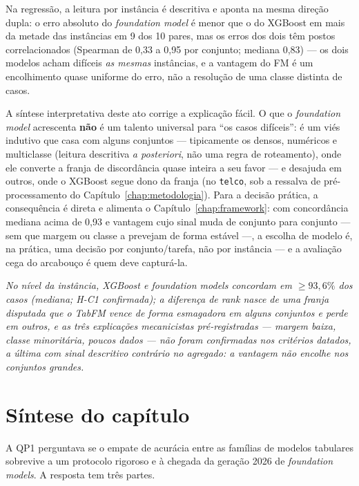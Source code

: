 Na regressão, a leitura por instância é descritiva e aponta na mesma
direção dupla: o erro absoluto do \emph{foundation model} é menor que o
do XGBoost em mais da metade das instâncias em 9 dos 10 pares, mas os
erros dos dois têm postos correlacionados (Spearman de 0{,}33 a 0{,}95
por conjunto; mediana 0{,}83) --- os dois modelos acham difíceis \emph{as mesmas}
instâncias, e a vantagem do FM é um encolhimento quase uniforme do
erro, não a resolução de uma classe distinta de casos.

A síntese interpretativa deste ato corrige a explicação fácil. O que o
\emph{foundation model} acrescenta \textbf{não} é um talento universal
para ``os casos difíceis'': é um viés indutivo que casa com alguns
conjuntos --- tipicamente os densos, numéricos e multiclasse (leitura
descritiva \emph{a posteriori}, não uma regra de roteamento), onde ele
converte a franja de discordância quase inteira a seu favor --- e
desajuda em outros, onde o XGBoost segue dono da franja (no
\texttt{telco}, sob a ressalva de pré-processamento do
Capítulo~\ref{chap:metodologia}). Para a decisão
prática, a consequência é direta e alimenta o
Capítulo~\ref{chap:framework}: com concordância mediana acima de 0{,}93
e vantagem cujo sinal muda de conjunto para conjunto --- sem que margem
ou classe a prevejam de forma estável ---, a escolha de modelo é, na
prática, uma decisão por conjunto/tarefa, não por
instância --- e a avaliação cega do arcabouço é quem deve capturá-la.

\emph{No nível da instância, XGBoost e \emph{foundation models}
concordam em ${\ge}93{,}6\%$ dos casos (mediana; H-C1 confirmada); a
diferença de rank nasce de uma franja disputada que o TabFM vence de
forma esmagadora em alguns conjuntos e perde em outros, e as três
explicações mecanicistas pré-registradas --- margem baixa, classe
minoritária, poucos dados --- não foram confirmadas nos critérios
datados, a última com sinal descritivo contrário no agregado: a
vantagem não encolhe nos
conjuntos grandes.}

\section{Síntese do capítulo}
\label{sec:cap5-sintese}

A QP1 perguntava se o empate de acurácia entre as famílias de
modelos tabulares sobrevive a um protocolo rigoroso e à chegada da
geração 2026 de \emph{foundation models}. A resposta tem três partes.


